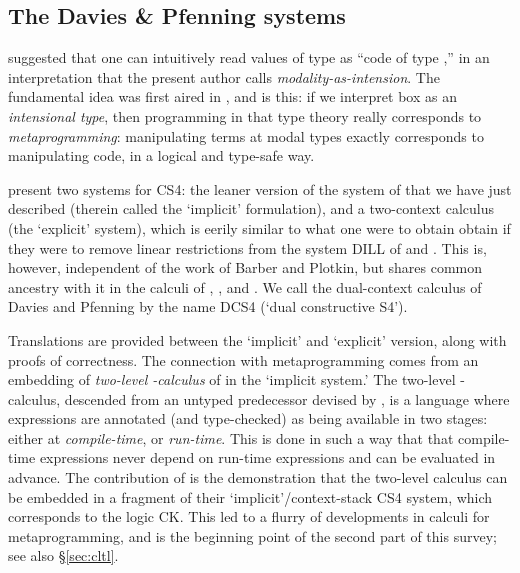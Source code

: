\documentclass[a4paper]{amsart}
\begin{document}
\subsection{The Davies \& Pfenning systems}
\label{sec:dcs4}

\cite{Davies1996, Davies1999, Davies2001a} suggested that one can
intuitively read values of type  as ``code of type ,''
in an interpretation that the present author calls
\emph{modality-as-intension}. The fundamental idea was first aired
in \citep{Pfenning1995}, and is this: if we interpret box as an
\emph{intensional type}, then programming in that type theory
really corresponds to \emph{metaprogramming}: manipulating terms
at modal types exactly corresponds to manipulating code, in a
logical and type-safe way.

\cite{Davies2001a} present two systems for \textsf{CS4}: the
leaner version of the system of \cite{Pfenning1995} that we have
just described (therein called the `implicit' formulation), and a
two-context calculus (the `explicit' system), which is eerily
similar to what one were to obtain obtain if they were to remove
linear restrictions from the system \textsf{DILL} of
\cite{Barber1996} and \cite{Plotkin1993}. This is, however,
independent of the work of Barber and Plotkin, but shares common
ancestry with it in the calculi of \cite{Girard1993},
\cite{Andreoli1992}, and \cite{Wadler1993, Wadler1994}. We call
the dual-context calculus of Davies and Pfenning by the name
\textsf{DCS4} (`dual constructive \textsf{S4}').

Translations are provided between the `implicit' and `explicit'
version, along with proofs of correctness. The connection with
metaprogramming comes from an embedding of \emph{two-level
-calculus} of \cite{Nielson1992} in the `implicit
system.' The two-level -calculus, descended from an
untyped predecessor devised by \cite{Gomard1991}, is a language
where expressions are annotated (and type-checked) as being
available in two stages: either at \emph{compile-time}, or
\emph{run-time}. This is done in such a way that that compile-time
expressions never depend on run-time expressions and can be
evaluated in advance. The contribution of \cite{Davies1996,
Davies1999, Davies2001a} is the demonstration that the two-level
calculus can be embedded in a fragment of their
`implicit'/context-stack \textsf{CS4} system, which corresponds to
the logic \textsf{CK}. This led to a flurry of developments in
calculi for metaprogramming, and is the beginning point of the
second part of this survey; see also \S \ref{sec:cltl}.
\end{document}
